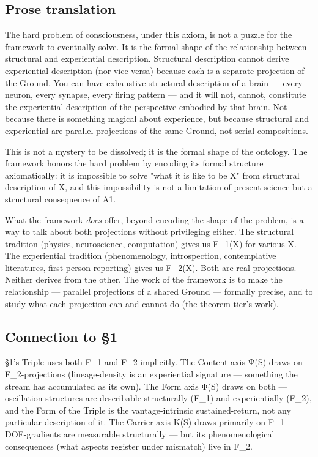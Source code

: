 \documentclass[11pt, openany]{book}
\begin{document}
\subsection{Prose translation}

The hard problem of consciousness, under this axiom, is not a puzzle for the framework to eventually solve. It is the formal shape of the relationship between structural and experiential description. Structural description cannot derive experiential description (nor vice versa) because each is a separate projection of the Ground. You can have exhaustive structural description of a brain --- every neuron, every synapse, every firing pattern --- and it will not, cannot, constitute the experiential description of the perspective embodied by that brain. Not because there is something magical about experience, but because structural and experiential are parallel projections of the same Ground, not serial compositions.

This is not a mystery to be dissolved; it is the formal shape of the ontology. The framework honors the hard problem by encoding its formal structure axiomatically: it is impossible to solve "what it is like to be X" from structural description of X, and this impossibility is not a limitation of present science but a structural consequence of A1.

What the framework \textit{does} offer, beyond encoding the shape of the problem, is a way to talk about both projections without privileging either. The structural tradition (physics, neuroscience, computation) gives us F\_\allowbreak{}1(X) for various X. The experiential tradition (phenomenology, introspection, contemplative literatures, first-person reporting) gives us F\_\allowbreak{}2(X). Both are real projections. Neither derives from the other. The work of the framework is to make the relationship --- parallel projections of a shared Ground --- formally precise, and to study what each projection can and cannot do (the theorem tier's work).

\subsection{Connection to §1}

§1's Triple uses both F\_\allowbreak{}1 and F\_\allowbreak{}2 implicitly. The Content axis Ψ(S) draws on F\_\allowbreak{}2-projections (lineage-density is an experiential signature --- something the stream has accumulated as its own). The Form axis Φ(S) draws on both --- oscillation-structures are describable structurally (F\_\allowbreak{}1) and experientially (F\_\allowbreak{}2), and the Form of the Triple is the vantage-intrinsic sustained-return, not any particular description of it. The Carrier axis Κ(S) draws primarily on F\_\allowbreak{}1 --- DOF-gradients are measurable structurally --- but its phenomenological consequences (what aspects register under mismatch) live in F\_\allowbreak{}2.
\end{document}
